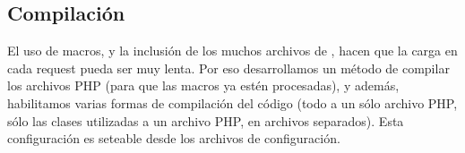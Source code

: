\subsection{Compilación}

El uso de macros, y la inclusión de los muchos archivos de \PWB, hacen que la carga en cada request pueda ser muy lenta. Por eso desarrollamos un método de compilar los archivos PHP (para que las macros ya estén procesadas), y además, habilitamos varias formas de compilación del código (todo a un sólo archivo PHP, sólo las clases utilizadas a un archivo PHP, en archivos separados). Esta configuración es seteable desde los archivos de configuración.